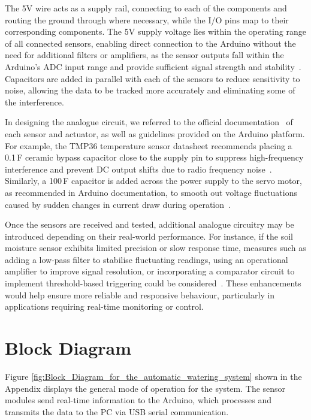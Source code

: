 \documentclass[a4paper,11pt]{article}
\begin{document}
The 5V wire acts as a supply rail, connecting to each of the components and routing the ground through where necessary, while the I/O pins map to their corresponding components. 
The 5V supply voltage lies within the operating range of all connected sensors, enabling direct connection to the Arduino without the need for additional filters or amplifiers, 
as the sensor outputs fall within the Arduino’s ADC input range and provide sufficient signal strength and stability~\cite{arduino_servo}.
Capacitors are added in parallel with each of the sensors to reduce sensitivity to noise, allowing the data to be tracked more accurately and eliminating some of the interference.

In designing the analogue circuit, we referred to the official documentation~\cite{arduino_servo,tmp36,dfrobot} of each sensor and actuator, as well as guidelines provided on the Arduino platform. 
For example, the TMP36 temperature sensor datasheet recommends placing a 0.1\,\textmu F ceramic bypass capacitor close to the supply pin to suppress high-frequency interference and prevent DC output shifts due to radio frequency noise~\cite{tmp36}. 
Similarly, a 100\,\textmu F capacitor is added across the power supply to the servo motor, as recommended in Arduino documentation, to smooth out voltage fluctuations caused by sudden changes in current draw during operation~\cite{arduino_servo}.

Once the sensors are received and tested, additional analogue circuitry may be introduced depending on their real-world performance. For instance, 
if the soil moisture sensor exhibits limited precision or slow response time, measures such as adding a low-pass filter to stabilise fluctuating readings, 
using an operational amplifier to improve signal resolution, or incorporating a comparator circuit to implement threshold-based triggering could be considered~\cite{dfrobot,yt}. 
These enhancements would help ensure more reliable and responsive behaviour, particularly in applications requiring real-time monitoring or control.


\section{Block Diagram}
\label{sec:Block_Diagram}

Figure \ref{fig:Block_Diagram_for_the_automatic_watering_system}
shown in the Appendix displays the general mode of operation for the system.
The sensor modules send real-time information to the Arduino,
which processes and transmits the data to the PC via USB serial communication.
\end{document}
